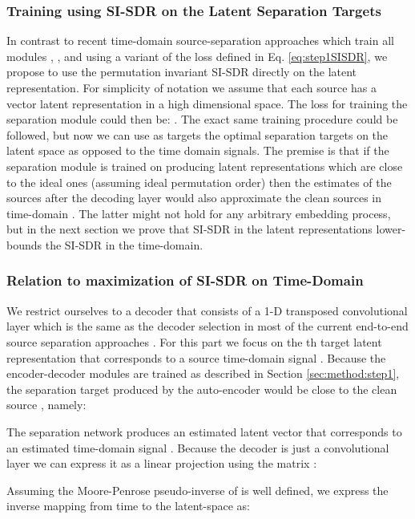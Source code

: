 \documentclass{article}
\begin{document}
\subsubsection{Training using SI-SDR on the Latent Separation Targets}
\label{sec:method:step2:SISDRonlatent}
In contrast to recent time-domain source-separation approaches \cite{luo2018tasnet, luo2019convTasNet} which train all modules , , and  using a variant of the loss defined in Eq. \ref{eq:step1SISDR}, we propose to use the permutation invariant SI-SDR directly on the latent representation. For simplicity of notation we assume that each source has a vector latent representation  in a high dimensional space. The loss for training the separation module could then be: . The exact same training procedure could be followed, but now we can use as targets the optimal separation targets on the latent space as opposed to the time domain signals. The premise is that if the separation module is trained on producing latent representations  which are close to the ideal ones (assuming ideal permutation order) then the estimates of the sources after the decoding layer would also approximate the clean sources in time-domain . The latter might not hold for any arbitrary embedding process, but in the next section we prove that SI-SDR in the latent representations lower-bounds the SI-SDR in the time-domain. 
\subsubsection{Relation to maximization of SI-SDR on Time-Domain}
\label{sec:method:step2:proof}
We restrict ourselves to a decoder that consists of a 1-D transposed convolutional layer which is the same as the decoder selection in most of the current end-to-end source separation approaches \cite{luo2018tasnet, luo2019convTasNet, kavalerov2019universal, venkataramani2018end}. For this part we focus on the th target latent representation  that corresponds to a source time-domain signal . Because the encoder-decoder modules are trained as described in Section \ref{sec:method:step1}, the separation target produced by the auto-encoder  would be close to the clean source , namely:

The separation network produces an estimated latent vector  that corresponds to an estimated time-domain signal . Because the decoder is just a convolutional layer we can express it as a linear projection  using the matrix :

Assuming the Moore-Penrose pseudo-inverse of  is well defined, we express the inverse mapping from time to the latent-space as:
\end{document}

